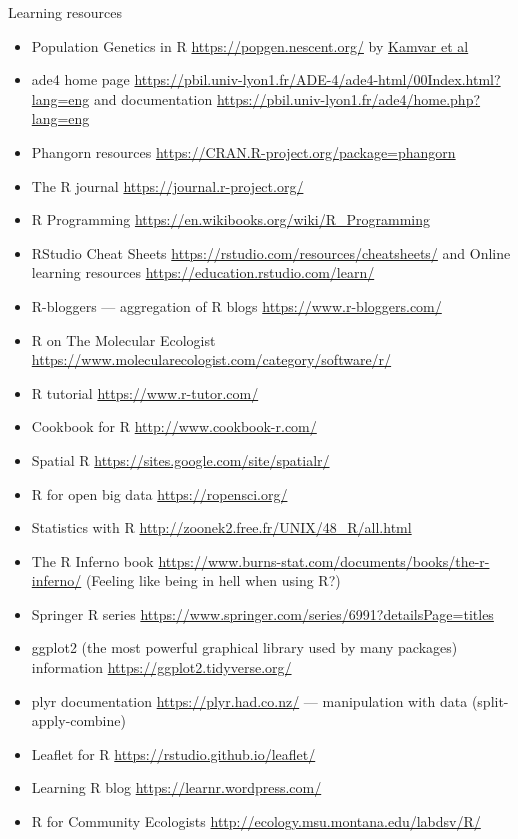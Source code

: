 \documentclass[compress, ucs, xelatex, 11pt, xcolor=svgnames, aspectratio=169,
	hyperref={
		bookmarks=true,
		unicode=true,
		colorlinks=true,
		pdftitle={Molecular data in R},
		plainpages=false,
		pdfauthor={Vojtech Zeisek},
		pdfsubject={Course about phylogeny and evolution in R},
		pdfcreator={XeLaTeX},
		pdfkeywords={R, evolution, phylogeny, molecular data},
		linkcolor=Crimson, %
		anchorcolor=Magenta, %
		citecolor=Magenta, %
		filecolor=Magenta, %
		menucolor=Magenta, %
		urlcolor=DodgerBlue, %
		pdftex},
	url={hyphens, lowtilde} %
	]{beamer}
\begin{document}
\begin{frame}[allowframebreaks]{Learning resources}
\begin{itemize}
		\item Population Genetics in R \url{https://popgen.nescent.org/} by \href{https://onlinelibrary.wiley.com/doi/full/10.1111/1755-0998.12558}{Kamvar et al}
		\item ade4 home page \url{https://pbil.univ-lyon1.fr/ADE-4/ade4-html/00Index.html?lang=eng} and documentation \url{https://pbil.univ-lyon1.fr/ade4/home.php?lang=eng}
		\item Phangorn resources \url{https://CRAN.R-project.org/package=phangorn}
		\item The R journal \url{https://journal.r-project.org/}
		\item R Programming \url{https://en.wikibooks.org/wiki/R_Programming}
		\item RStudio Cheat Sheets \url{https://rstudio.com/resources/cheatsheets/} and Online learning resources \url{https://education.rstudio.com/learn/}
		\item R-bloggers --- aggregation of R blogs \url{https://www.r-bloggers.com/}
		\item R on The Molecular Ecologist \url{https://www.molecularecologist.com/category/software/r/}
		\item R tutorial \url{https://www.r-tutor.com/}
		\item Cookbook for R  \url{http://www.cookbook-r.com/}
		\item Spatial R \url{https://sites.google.com/site/spatialr/}
		\item R for open big data \url{https://ropensci.org/}
		\item Statistics with R \url{http://zoonek2.free.fr/UNIX/48_R/all.html}
		\item The R Inferno book \url{https://www.burns-stat.com/documents/books/the-r-inferno/} (Feeling like being in hell when using R?)
		\item Springer R series \url{https://www.springer.com/series/6991?detailsPage=titles}
		\item ggplot2 (the most powerful graphical library used by many packages) information \url{https://ggplot2.tidyverse.org/}
		\item plyr documentation \url{https://plyr.had.co.nz/} --- manipulation with data (split-apply-combine)
		\item Leaflet for R \url{https://rstudio.github.io/leaflet/}
		\item Learning R blog \url{https://learnr.wordpress.com/}
		\item R for Community Ecologists \url{http://ecology.msu.montana.edu/labdsv/R/}

\end{itemize}
\end{frame}
\end{document}
